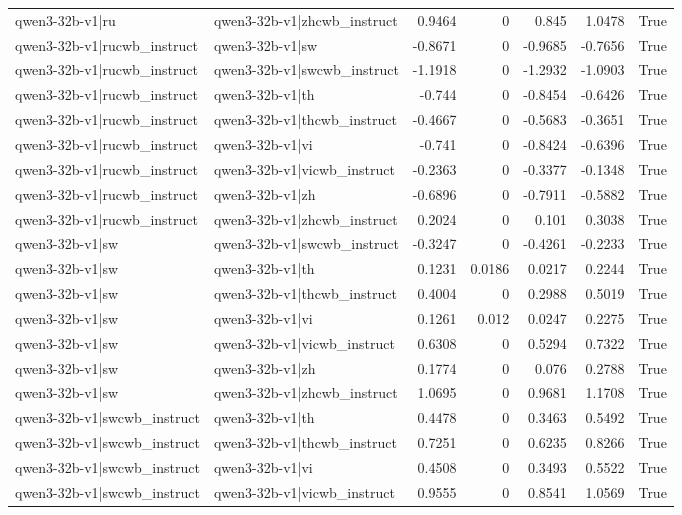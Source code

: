 \begin{table}
\begin{tabular}{l l r r r r l}
qwen3-32b-v1|ru & qwen3-32b-v1|zhcwb_instruct & 0.9464 & 0 & 0.845 & 1.0478 & True \\
qwen3-32b-v1|rucwb_instruct & qwen3-32b-v1|sw & -0.8671 & 0 & -0.9685 & -0.7656 & True \\
qwen3-32b-v1|rucwb_instruct & qwen3-32b-v1|swcwb_instruct & -1.1918 & 0 & -1.2932 & -1.0903 & True \\
qwen3-32b-v1|rucwb_instruct & qwen3-32b-v1|th & -0.744 & 0 & -0.8454 & -0.6426 & True \\
qwen3-32b-v1|rucwb_instruct & qwen3-32b-v1|thcwb_instruct & -0.4667 & 0 & -0.5683 & -0.3651 & True \\
qwen3-32b-v1|rucwb_instruct & qwen3-32b-v1|vi & -0.741 & 0 & -0.8424 & -0.6396 & True \\
qwen3-32b-v1|rucwb_instruct & qwen3-32b-v1|vicwb_instruct & -0.2363 & 0 & -0.3377 & -0.1348 & True \\
qwen3-32b-v1|rucwb_instruct & qwen3-32b-v1|zh & -0.6896 & 0 & -0.7911 & -0.5882 & True \\
qwen3-32b-v1|rucwb_instruct & qwen3-32b-v1|zhcwb_instruct & 0.2024 & 0 & 0.101 & 0.3038 & True \\
qwen3-32b-v1|sw & qwen3-32b-v1|swcwb_instruct & -0.3247 & 0 & -0.4261 & -0.2233 & True \\
qwen3-32b-v1|sw & qwen3-32b-v1|th & 0.1231 & 0.0186 & 0.0217 & 0.2244 & True \\
qwen3-32b-v1|sw & qwen3-32b-v1|thcwb_instruct & 0.4004 & 0 & 0.2988 & 0.5019 & True \\
qwen3-32b-v1|sw & qwen3-32b-v1|vi & 0.1261 & 0.012 & 0.0247 & 0.2275 & True \\
qwen3-32b-v1|sw & qwen3-32b-v1|vicwb_instruct & 0.6308 & 0 & 0.5294 & 0.7322 & True \\
qwen3-32b-v1|sw & qwen3-32b-v1|zh & 0.1774 & 0 & 0.076 & 0.2788 & True \\
qwen3-32b-v1|sw & qwen3-32b-v1|zhcwb_instruct & 1.0695 & 0 & 0.9681 & 1.1708 & True \\
qwen3-32b-v1|swcwb_instruct & qwen3-32b-v1|th & 0.4478 & 0 & 0.3463 & 0.5492 & True \\
qwen3-32b-v1|swcwb_instruct & qwen3-32b-v1|thcwb_instruct & 0.7251 & 0 & 0.6235 & 0.8266 & True \\
qwen3-32b-v1|swcwb_instruct & qwen3-32b-v1|vi & 0.4508 & 0 & 0.3493 & 0.5522 & True \\
qwen3-32b-v1|swcwb_instruct & qwen3-32b-v1|vicwb_instruct & 0.9555 & 0 & 0.8541 & 1.0569 & True \\

\end{tabular}
\end{table}
